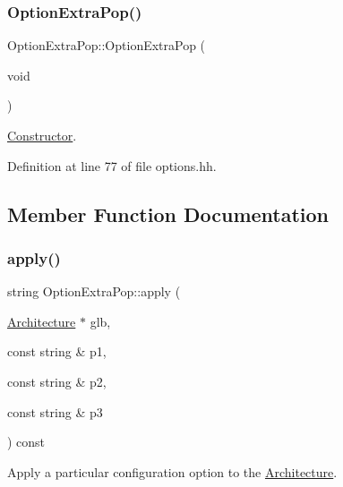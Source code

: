 \subsubsection{\texorpdfstring{OptionExtraPop()}{OptionExtraPop()}}
{\footnotesize\ttfamily Option\+Extra\+Pop\+::\+Option\+Extra\+Pop (\begin{DoxyParamCaption}\item[{void}]{ }\end{DoxyParamCaption})\hspace{0.3cm}{\ttfamily [inline]}}



\mbox{\hyperlink{class_constructor}{Constructor}}. 



Definition at line 77 of file options.\+hh.



\subsection{Member Function Documentation}
\mbox{\label{class_option_extra_pop_a19de8bfd77683f807a1a20ba4d9103dc}} 
\subsubsection{\texorpdfstring{apply()}{apply()}}
{\footnotesize\ttfamily string Option\+Extra\+Pop\+::apply (\begin{DoxyParamCaption}\item[{\mbox{\hyperlink{class_architecture}{Architecture}} $\ast$}]{glb,  }\item[{const string \&}]{p1,  }\item[{const string \&}]{p2,  }\item[{const string \&}]{p3 }\end{DoxyParamCaption}) const\hspace{0.3cm}{\ttfamily [virtual]}}



Apply a particular configuration option to the \mbox{\hyperlink{class_architecture}{Architecture}}. 

